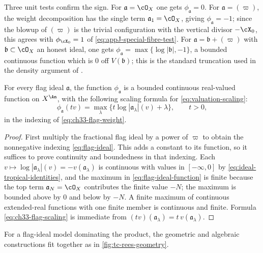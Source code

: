 Three unit tests confirm the sign.  For $\mathfrak a=\cO_X$ one gets
$\phi_{\mathfrak a}=0$.  For $\mathfrak a=(\varpi)$, the weight
decomposition has the single term $\mathfrak a_1=\cO_X$, giving
$\phi_{\mathfrak a}=-1$; since the blowup of $(\varpi)$ is the trivial
configuration with the vertical divisor $-\cX_0$, this agrees with
$\phi_{\cX_0}=1$ of \eqref{eq:appJ-special-fibre-test}.  For
$\mathfrak a=\mathfrak b+(\varpi)$ with $\mathfrak b\subset\cO_X$ an
honest ideal, one gets
$\phi_{\mathfrak a}=\max\{\log|\mathfrak b|,-1\}$, a bounded continuous
function which is $0$ off $V(\mathfrak b)$; this is the standard
truncation used in the density argument of
.

\begin{lemma}\label{lem:ch33-flag-continuity}
For every flag ideal $\mathfrak a$, the function $\phi_{\mathfrak a}$ is
a bounded continuous real-valued function on $X^{\An}$, with the following
scaling formula for \eqref{eq:valuation-scaling}:
\begin{equation}
\label{eq:ch33-flag-scaling}
 \phi_{\mathfrak a}(tv)
 =\max_\lambda\{t\log|\mathfrak a_\lambda|(v)+\lambda\},
 \qquad t>0 ,
\end{equation}
in the indexing of \eqref{eq:ch33-flag-weight}.
\end{lemma}

\begin{proof}
First multiply the fractional flag ideal by a power of $\varpi$ to
obtain the nonnegative indexing \eqref{eq:flag-ideal}.  This adds a
constant to its function, so it suffices to prove continuity and
boundedness in that indexing.
Each $v\mapsto\log|\mathfrak a_\lambda|(v)=-v(\mathfrak a_\lambda)$ is
continuous with values in $[-\infty,0]$ by
\eqref{eq:ideal-tropical-identities}, and the maximum in
\eqref{eq:flag-ideal-function} is finite because the top term
$\mathfrak a_N=\cO_X$ contributes the finite value $-N$; the maximum is
bounded above by $0$ and below by $-N$.  A finite maximum of continuous
extended-real functions with one finite member is continuous and finite.
Formula \eqref{eq:ch33-flag-scaling} is immediate from
$(tv)(\mathfrak a_\lambda)=t\,v(\mathfrak a_\lambda)$.
\end{proof}

For a flag-ideal model dominating the product, the geometric and algebraic
constructions fit together as in \cref{fig:tc-rees-geometry}.

